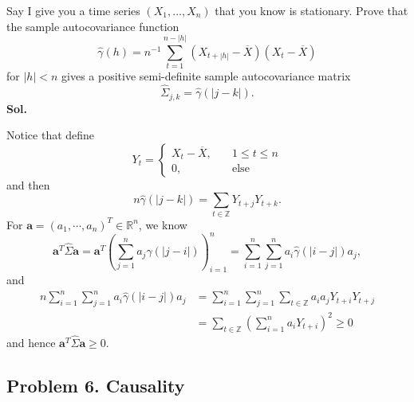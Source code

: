 \documentclass[lang=en,11pt,a4paper,citestyle =authoryear]{elegantpaper}
\newcommand{\Z}{\mathbb{Z}}
\newcommand{\R}{\mathbb{R}}
\begin{document}
Say I give you a time series $(X_1,\ldots,X_n)$ that you know is
stationary. Prove that the sample autocovariance function
\[
\widehat{\gamma}(h)
=n^{-1}\sum_{t=1}^{n-|h|}
  (X_{t+|h|}-\overline{X})(X_t-\overline{X})
\]
for $|h|<n$ gives a positive semi-definite sample autocovariance
matrix
\[
\widehat{\Sigma}_{j,k}=\widehat{\gamma}(|j-k|).
\]
\vspace{0.5em}
\textbf{Sol.} \par
Notice that define
\[
Y_t = \begin{cases}
    X_t - \overline{X},\quad &1\leq t \leq n \\
    0,\quad&\text{else}
\end{cases}
\]
and then
\[
n\widehat{\gamma}(|j-k|) = \sum\limits_{t\in\mathbb{Z}} Y_{t+j}Y_{t+k}.
\]
For $\mathbf{a} = (a_1,\cdots,a_n)^T \in \R^n$, we know
\[
    \mathbf{a}^T \widehat{\Sigma} \mathbf{a} = \mathbf{a}^T\left(\sum\limits_{j=1}^n a_j\widehat{\gamma}(|j-i|)\right)_{i=1}^n = \sum\limits_{i=1}^n\sum\limits_{j=1}^n a_i\widehat{\gamma}(|i-j|)a_j,
\]
and
\[
\begin{aligned}
    n\sum\limits_{i=1}^n\sum\limits_{j=1}^n a_i\widehat{\gamma}(|i-j|)a_j &= \sum\limits_{i=1}^n\sum\limits_{j=1}^n\sum\limits_{t\in\Z} a_ia_jY_{t+i}Y_{t+j} \\
    &= \sum\limits_{t\in\Z}\left(\sum\limits_{i=1}^n a_i Y_{t+i}\right)^2 \geq 0
\end{aligned}
\]
and hence
$\mathbf{a}^T \widehat{\Sigma} \mathbf{a} \geq 0$.
\par 
\vspace{0.5em}

\subsection*{Problem 6. Causality} 
\end{document}
